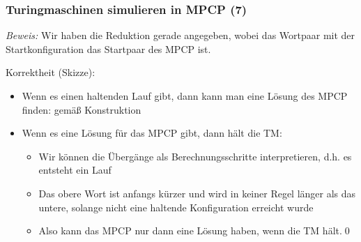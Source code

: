 \documentclass[aspectratio=1610,onlymath]{beamer}
\begin{document}
\begin{frame}\frametitle{Turingmaschinen simulieren in MPCP (7)}


\emph{Beweis:} Wir haben die Reduktion gerade angegeben, wobei das Wortpaar
mit der Startkonfiguration das Startpaar des MPCP ist.
\bigskip

Korrektheit (Skizze):
\begin{itemize}
\item Wenn es einen haltenden Lauf gibt, dann kann man eine Lösung des MPCP finden: gemäß Konstruktion
\item Wenn es eine Lösung für das MPCP gibt, dann hält die TM:
	\begin{itemize}
	\item Wir können die Übergänge als Berechnungsschritte interpretieren, d.h. es entsteht ein Lauf
	\item Das obere Wort ist anfangs kürzer und wird in keiner Regel länger als das untere, solange nicht eine haltende Konfiguration erreicht wurde
	\item Also kann das MPCP nur dann eine Lösung haben, wenn die TM hält.\qed
	\end{itemize}
\end{itemize}

\end{frame}
\end{document}
